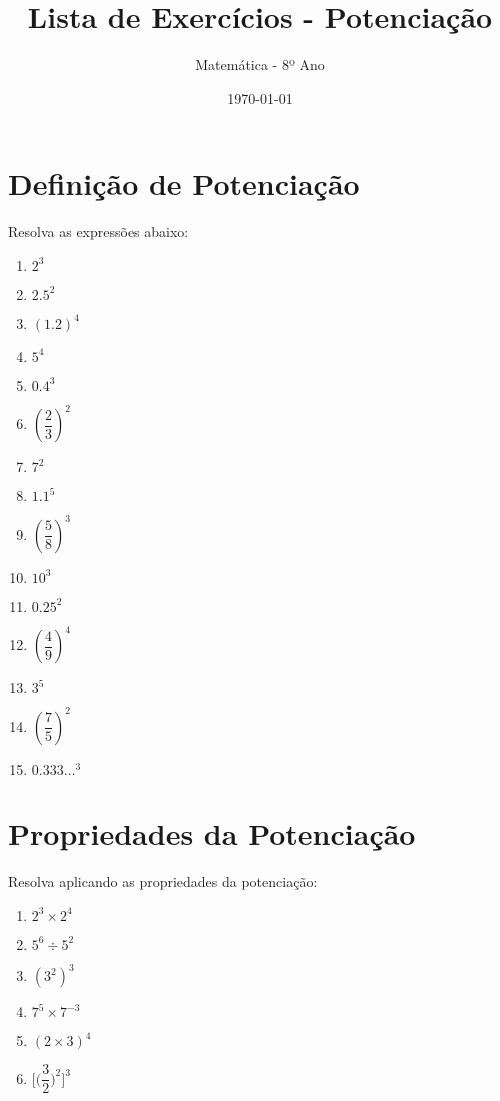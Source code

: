 \documentclass[a4paper,12pt]{article}
\begin{document}
	
	\title{Lista de Exercícios - Potenciação}
	\author{Matemática - 8º Ano}
	\date{\today}
	\maketitle
	
	\begin{multicols}{2}
		
		\section*{Definição de Potenciação}
		Resolva as expressões abaixo:
		\begin{multicols}{3}
		\begin{enumerate}
			\item $2^3$ \item  $2.5^2$ \item $(1.2)^4$
			\item $5^4$ \item $0.4^3$ \item $\left(\dfrac{2}{3}\right)^2$
			\item $7^2$ \item $1.1^5$ \item $\left(\dfrac{5}{8}\right)^3$
			\item $10^3$ \item $0.25^2$ \item $\left(\dfrac{4}{9}\right)^4$
			\item $3^5$  \item $\left(\dfrac{7}{5}\right)^2$ \item $0.333\ldots^3$ 
		\end{enumerate}
		\end{multicols}
	
		\section*{Propriedades da Potenciação}
		Resolva aplicando as propriedades da potenciação:
		\begin{multicols}{2}
		\begin{enumerate}
			\item $2^3 \times 2^4$
			\item $5^6 \div 5^2$
			\item $(3^2)^3$
			\item $7^5 \times 7^{-3}$
			\item $(2 \times 3)^4$
			\item $ \Bigg[ \bigg( \dfrac{3}{2} \bigg)^{2} \Bigg] ^{3}$
		\end{enumerate}
		\end{multicols}
		

\end{multicols}
\end{document}
